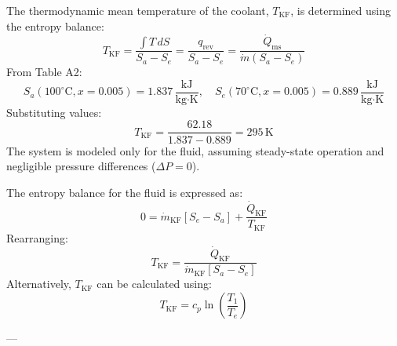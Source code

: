The thermodynamic mean temperature of the coolant, \( T_{\text{KF}} \), is determined using the entropy balance:  
\[
T_{\text{KF}} = \frac{\int T \, dS}{S_a - S_e} = \frac{q_{\text{rev}}}{S_a - S_e} = \frac{\dot{Q}_{\text{ms}}}{\dot{m} (S_a - S_e)}
\]  
From Table A2:  
\[
S_a(100^\circ\text{C}, x = 0.005) = 1.837 \, \frac{\text{kJ}}{\text{kg·K}}, \quad S_e(70^\circ\text{C}, x = 0.005) = 0.889 \, \frac{\text{kJ}}{\text{kg·K}}
\]  
Substituting values:  
\[
T_{\text{KF}} = \frac{62.18}{1.837 - 0.889} = 295 \, \text{K}
\]  
The system is modeled only for the fluid, assuming steady-state operation and negligible pressure differences (\( \Delta P = 0 \)).

The entropy balance for the fluid is expressed as:  
\[
0 = \dot{m}_{\text{KF}} \left[ S_e - S_a \right] + \frac{\dot{Q}_{\text{KF}}}{T_{\text{KF}}}
\]  
Rearranging:  
\[
T_{\text{KF}} = \frac{\dot{Q}_{\text{KF}}}{\dot{m}_{\text{KF}} \left[ S_a - S_e \right]}
\]  
Alternatively, \( T_{\text{KF}} \) can be calculated using:  
\[
T_{\text{KF}} = c_p \ln \left( \frac{T_1}{T_e} \right)
\]

---